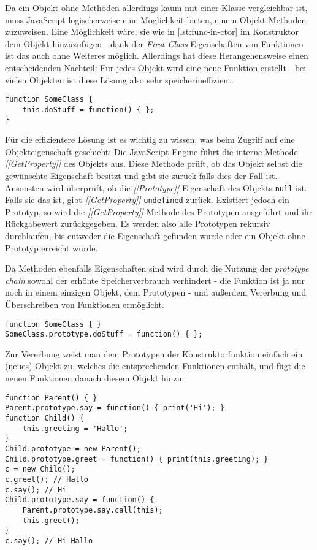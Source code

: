 Da ein Objekt ohne Methoden allerdings kaum mit einer Klasse vergleichbar ist, muss JavaScript
logischerweise eine Möglichkeit bieten, einem Objekt Methoden zuzuweisen. Eine Möglichkeit wäre, sie
wie in \autoref{lst:func-in-ctor} im Konstruktor dem Objekt hinzuzufügen - dank der
\emph{First-Class}-Eigenschaften von Funktionen ist das auch ohne Weiteres möglich. Allerdings hat
diese Herangehensweise einen entscheidenden Nachteil: Für jedes Objekt wird eine neue Funktion
erstellt - bei vielen Objekten ist diese Lösung also sehr speicherineffizient.

\begin{lstlisting}[label=lst:func-in-ctor,caption=Funktionszuweisung im Konstruktor]
function SomeClass {
    this.doStuff = function() { };
}
\end{lstlisting}

Für die effizientere Lösung ist es wichtig zu wissen, was beim Zugriff auf eine Objekteigenschaft
geschieht: Die JavaScript-Engine führt die interne Methode \emph{[[GetProperty]]} des Objekts aus.
Diese Methode prüft, ob das Objekt selbst die gewünschte Eigenschaft besitzt und gibt sie zurück
falls dies der Fall ist. Ansonsten wird überprüft, ob die \emph{[[Prototype]]}-Eigenschaft des
Objekts \lstinline{null} ist. Falls sie das ist, gibt \emph{[[GetProperty]]} \lstinline{undefined}
zurück. Existiert jedoch ein Prototyp, so wird die \emph{[[GetProperty]]}-Methode des Prototypen
ausgeführt und ihr Rückgabewert zurückgegeben. Es werden also alle Prototypen rekursiv durchlaufen,
bis entweder die Eigenschaft gefunden wurde oder ein Objekt ohne Prototyp erreicht wurde.

Da Methoden ebenfalls Eigenschaften sind wird durch die Nutzung der \emph{prototype chain} sowohl
der erhöhte Speicherverbrauch verhindert - die Funktion ist ja nur noch in einem einzigen Objekt,
dem Prototypen - und außerdem Vererbung und Überschreiben von Funktionen ermöglicht.

\begin{lstlisting}[label=lst:func-in-proto,caption=Funktionszuweisung im Prototypen]
function SomeClass { }
SomeClass.prototype.doStuff = function() { };
\end{lstlisting}

Zur Vererbung weist man dem Prototypen der Konstruktorfunktion einfach ein (neues) Objekt zu,
welches die entsprechenden Funktionen enthält, und fügt die neuen Funktionen danach diesem Objekt
hinzu.

\begin{lstlisting}[label=lst:proto-inheritance,caption=Prototypische Vererbung]
function Parent() { }
Parent.prototype.say = function() { print('Hi'); }
function Child() {
    this.greeting = 'Hallo';
}
Child.prototype = new Parent();
Child.prototype.greet = function() { print(this.greeting); }
c = new Child();
c.greet(); // Hallo
c.say(); // Hi
Child.prototype.say = function() {
    Parent.prototype.say.call(this);
    this.greet();
}
c.say(); // Hi Hallo
\end{lstlisting}

